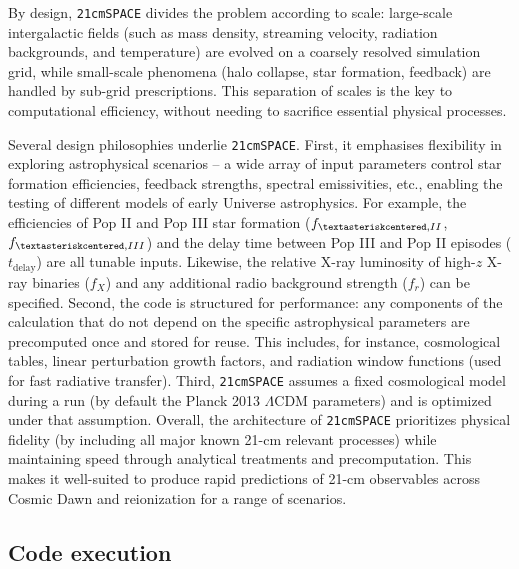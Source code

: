 \documentclass[floats,floatfix,showpacs,amssymb,prd,superscriptaddress,nofootinbib, 11pt]{revtex4-2} %
\newcommand{\code}{\texttt}
\newcommand{\red}{\textcolor{red}}
\begin{document}
By design, \code{21cmSPACE} divides the problem according to scale: large-scale intergalactic fields (such as mass density, streaming velocity, radiation backgrounds, and temperature) are evolved on a coarsely resolved simulation grid, while small-scale phenomena (halo collapse, star formation, feedback) are handled by sub-grid prescriptions. 
This separation of scales is the key to computational efficiency, without needing to sacrifice essential physical processes.

Several design philosophies underlie \code{21cmSPACE}. First, it emphasises flexibility in exploring astrophysical scenarios -- a wide array of input parameters
control star formation efficiencies, feedback strengths, spectral emissivities, etc., enabling the testing of different models of early Universe astrophysics. For example, the efficiencies of Pop II  and Pop III star formation ($f_{\textasteriskcentered,II}$, $f_{\textasteriskcentered,III}$) and the delay time between Pop III and Pop II episodes ($t_{\text{delay}}$) are all tunable inputs. Likewise, the relative X-ray luminosity of high-$z$ X-ray binaries ($f_X$) and any additional radio background strength ($f_r$) can be specified. Second, the code is structured for performance: any components of the calculation that do not depend on the specific astrophysical parameters are precomputed once and stored for reuse. This includes, for instance, cosmological tables, linear perturbation growth factors, and radiation window functions (used for fast radiative transfer). Third, \code{21cmSPACE} assumes a fixed cosmological model during a run (by default the Planck 2013 $\Lambda$CDM parameters) and is optimized under that assumption. 
Overall, the architecture of \code{21cmSPACE} prioritizes physical fidelity (by including all major known 21-cm relevant processes) while maintaining speed through analytical treatments and precomputation. This makes it well-suited to produce rapid predictions of 21-cm observables across Cosmic Dawn and reionization for a range of scenarios.


\subsection{Code execution}
\end{document}
